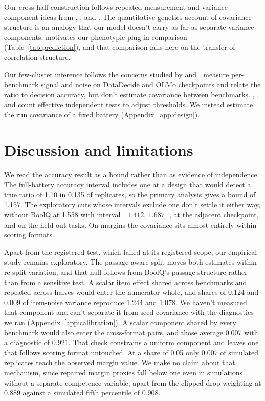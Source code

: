 \documentclass{article}
\newcommand{\ci}[2]{\ensuremath{[#1,\,#2]}}
\begin{document}
Our cross-half construction follows repeated-measurement and variance-component ideas from \citet{spearman1904}, \citet{cronbach1951}, and \citet{searle1992}. The quantitative-genetics account of covariance structure \citep{martin1977} is an analogy that our model doesn't carry as far as separate variance components. \citet{cheverud1988} motivates our phenotypic plug-in comparison (Table~\ref{tab:prediction}), and that comparison fails here on the transfer of correlation structure.

Our few-cluster inference follows the concerns studied by \citet{cameron2008} and \citet{mackinnon2017}. \citet{heineman2025} measure per-benchmark signal and noise on DataDecide and OLMo checkpoints and relate the ratio to decision accuracy, but don't estimate covariance between benchmarks. \citet{cheverud2001}, \citet{nyholt2004}, and \citet{li2005} count effective independent tests to adjust thresholds. We instead estimate the run covariance of a fixed battery (Appendix~\ref{app:design}).

\section{Discussion and limitations}
We read the accuracy result as a bound rather than as evidence of independence. The full-battery accuracy interval includes one at a design that would detect a true ratio of 1.10 in 0.135 of replicates, so the primary analysis gives a bound of 1.157. The exploratory cuts whose intervals exclude one don't settle it either way, without BoolQ at 1.558 with interval \ci{1.412}{1.687}, at the adjacent checkpoint, and on the held-out tasks. On margins the covariance sits almost entirely within scoring formats.

Apart from the registered test, which failed at its registered scope, our empirical study remains exploratory. The passage-aware split moves both estimates within re-split variation, and that null follows from BoolQ's passage structure rather than from a sensitive test. A scalar item effect shared across benchmarks and repeated across halves would enter the numerator whole, and shares of 0.124 and 0.009 of item-noise variance reproduce 1.244 and 1.078. We haven't measured that component and can't separate it from seed covariance with the diagnostics we ran (Appendix~\ref{app:calibration}). A scalar component shared by every benchmark would also enter the cross-format pairs, and those average 0.007 with a diagnostic of 0.921. That check constrains a uniform component and leaves one that follows scoring format untouched. At a share of 0.05 only 0.007 of simulated replicates reach the observed margin value. We make no claim about that mechanism, since repaired margin proxies fall below one even in simulations without a separate competence variable, apart from the clipped-drop weighting at 0.889 against a simulated fifth percentile of 0.908.
\end{document}
